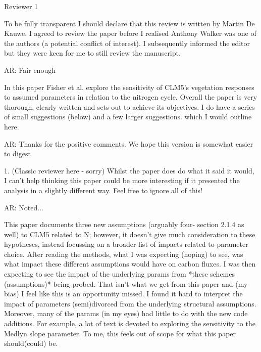 \documentclass{article}
\begin{document}
\textsf{Reviewer 1}

To be fully transparent I should declare that this review is written by Martin De Kauwe. I agreed to review the paper before I realised Anthony Walker was one of the authors (a potential conflict of interest). I subsequently informed the editor but they were keen for me to still review the manuscript. 

\textsf{AR: Fair enough}

In this paper Fisher et al. explore the sensitivity of CLM5's vegetation responses to assumed parameters in relation to the nitrogen cycle. Overall the paper is very thorough, clearly written and sets out to achieve its objectives. I do have a series of small suggestions (below) and a few larger suggestions. which I would outline here. 

\textsf{AR: Thanks for the positive comments. We hope this version is somewhat easier to digest}

1. (Classic reviewer here - sorry) Whilst the paper does do what it said it would, I can't help thinking this paper could be more interesting if it presented the analysis in a slightly different way. Feel free to ignore all of this! 

\textsf{AR: Noted...}

This paper documents three new assumptions (arguably four- section 2.1.4 as well) to CLM5 related to N; however, it doesn't give much consideration to these hypotheses, instead focussing on a broader list of impacts related to parameter choice. After reading the methods, what I was expecting (hoping) to see, was what impact these different assumptions would have on carbon fluxes. I was then expecting to see the impact of the underlying params from *these schemes (assumptions)* being probed. That isn't what we get from this paper and (my bias) I feel like this is an opportunity missed. I found it hard to interpret the impact of parameters (semi)divorced from the underlying structural assumptions. Moreover, many of the params (in my eyes) had little to do with the new code additions. For example, a lot of text is devoted to exploring the sensitivity to the Medlyn slope parameter. To me, this feels out of scope for what this paper should(could) be. 
\end{document}
